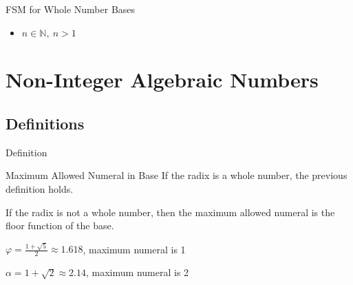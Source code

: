 \documentclass{beamer}
\begin{document}
\begin{frame}{FSM for Whole Number Bases}
  \begin{center}
  \end{center}
  \begin{itemize}
    \item $n\in\mathbb{N},\ n>1$
  \end{itemize}
\end{frame}
















\section{Non-Integer Algebraic Numbers}












\subsection{Definitions}
\begin{frame}{Definition}
  \begin{block}{Maximum Allowed Numeral in Base}
    If the radix is a whole number, the previous definition holds.

    If the radix is not a whole number, then the maximum allowed numeral is the floor function of the base.
  \end{block}\pause

  \begin{example}\pause
    $\varphi = \frac{1+\sqrt{5}}{2} \approx 1.618$, maximum numeral is 1 \pause

    $\alpha = 1+\sqrt{2} \approx 2.14$, maximum numeral is 2
  \end{example}
\end{frame}
\end{document}
